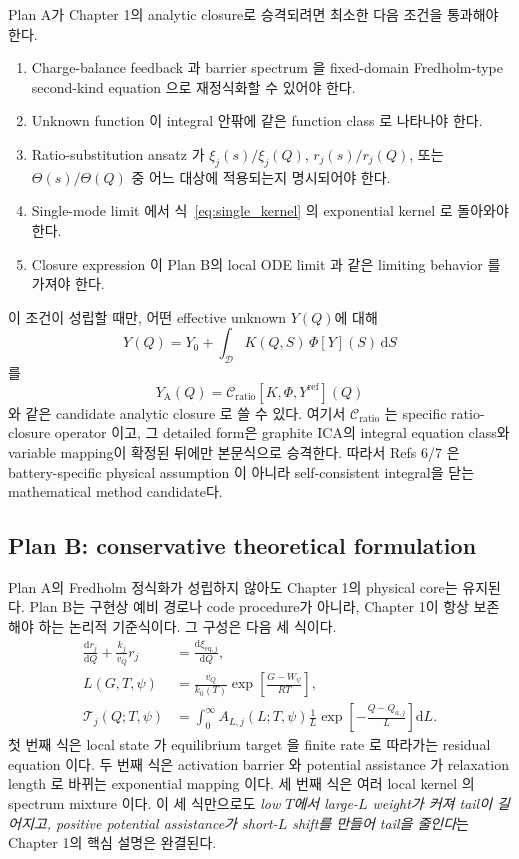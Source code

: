 \documentclass[11pt,a4paper]{article}
\newcommand{\dd}{\mathrm{d}}
\newcommand{\eq}{\mathrm{eq}}
\begin{document}
Plan A가 Chapter 1의 analytic closure로 승격되려면 최소한 다음 조건을 통과해야 한다.
\begin{enumerate}[label=\textbf{M\arabic*.}]
\item Charge-balance feedback 과 barrier spectrum 을 fixed-domain Fredholm-type second-kind
  equation 으로 재정식화할 수 있어야 한다.
\item Unknown function 이 integral 안팎에 같은 function class 로 나타나야 한다.
\item Ratio-substitution ansatz 가 $\xi_j(s)/\xi_j(Q)$, $r_j(s)/r_j(Q)$, 또는
  $\Theta(s)/\Theta(Q)$ 중 어느 대상에 적용되는지 명시되어야 한다.
\item Single-mode limit 에서 식~\eqref{eq:single_kernel} 의 exponential kernel 로 돌아와야 한다.
\item Closure expression 이 Plan B의 local ODE limit 과 같은 limiting behavior 를 가져야 한다.
\end{enumerate}

이 조건이 성립할 때만, 어떤 effective unknown $Y(Q)$에 대해
\begin{equation}
Y(Q)=Y_0+\int_{\mathcal D}K(Q,S)\,\Phi[Y](S)\,\dd S
\label{eq:closure_general}
\end{equation}
를
\begin{equation}
Y_{\mathrm A}(Q)=
\mathcal C_{\mathrm{ratio}}\!\left[K,\Phi,Y^{\mathrm{ref}}\right](Q)
\label{eq:plan_a_closure}
\end{equation}
와 같은 candidate analytic closure 로 쓸 수 있다. 여기서 $\mathcal C_{\mathrm{ratio}}$ 는
specific ratio-closure operator 이고, 그 detailed form은 graphite ICA의 integral equation class와
variable mapping이 확정된 뒤에만 본문식으로 승격한다. 따라서 Refs 6/7 은 battery-specific
physical assumption 이 아니라 self-consistent integral을 닫는 mathematical method candidate다.

\subsection{Plan B: conservative theoretical formulation}\label{sec:track2}
Plan A의 Fredholm 정식화가 성립하지 않아도 Chapter 1의 physical core는 유지된다. Plan B는
구현상 예비 경로나 code procedure가 아니라, Chapter 1이 항상 보존해야 하는 논리적 기준식이다.
그 구성은 다음 세 식이다.
\begin{align}
\frac{\dd r_j}{\dd Q}+\frac{k_j}{v_Q}r_j
&=
\frac{\dd\xi_{\eq,j}}{\dd Q},
\label{eq:planb_residual}
\\
L(G,T,\psi)
&=
\frac{v_Q}{k_0(T)}
\exp\!\left[\frac{G-W_\psi}{RT}\right],
\label{eq:planb_length}
\\
\mathcal T_j(Q;T,\psi)
&=
\int_0^\infty
A_{L,j}(L;T,\psi)\frac{1}{L}
\exp\!\left[-\frac{Q-Q_{a,j}}{L}\right]\dd L.
\label{eq:planb_tail}
\end{align}
첫 번째 식은 local state 가 equilibrium target 을 finite rate 로 따라가는 residual equation 이다.
두 번째 식은 activation barrier 와 potential assistance 가 relaxation length 로 바뀌는 exponential
mapping 이다. 세 번째 식은 여러 local kernel 의 spectrum mixture 이다. 이 세 식만으로도
\emph{low $T$에서 large-$L$ weight가 커져 tail이 길어지고, positive potential assistance가
short-$L$ shift를 만들어 tail을 줄인다}는 Chapter 1의 핵심 설명은 완결된다.
\end{document}
